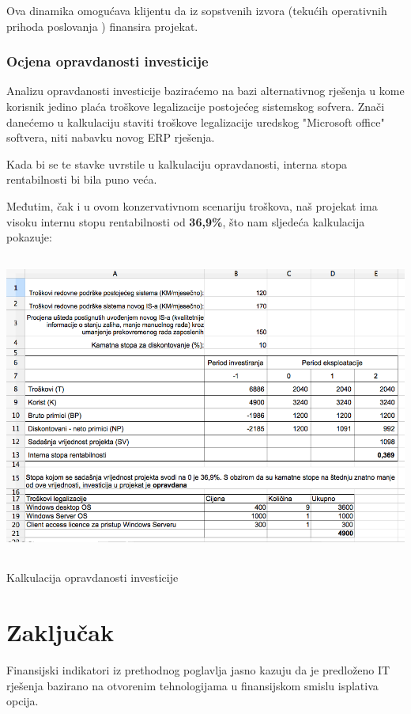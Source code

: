 \documentclass[times, utf8, seminar]{fit}
\begin{document}
Ova dinamika omogućava klijentu da iz sopstvenih izvora (tekućih operativnih prihoda poslovanja \cite{prasorep}) finansira projekat.

\subsection{Ocjena opravdanosti investicije}

Analizu opravdanosti investicije baziraćemo na bazi alternativnog rješenja u kome korisnik jedino plaća troškove legalizacije postojećeg sistemskog sofvera.
Znači danećemo u kalkulaciju staviti troškove legalizacije uredskog "Microsoft office" softvera, niti nabavku novog ERP rješenja.

Kada bi se te stavke uvrstile u kalkulaciju opravdanosti, interna stopa rentabilnosti bi bila puno veća.

Međutim, čak i u ovom konzervativnom scenariju troškova, naš projekat ima visoku internu stopu rentabilnosti od \textbf{36,9\%}, što nam sljedeća kalkulacija pokazuje:

\begin{table}[!h]
\centering
\includegraphics[height=10cm]{img/kalk_opravdanost.png}
\caption{Kalkulacija opravdanosti investicije}
\end{table}

\chapter{Zaključak}

Finansijski indikatori iz prethodnog poglavlja jasno kazuju da je predloženo IT rješenja bazirano na otvorenim tehnologijama u finansijskom smislu isplativa opcija.
\end{document}

